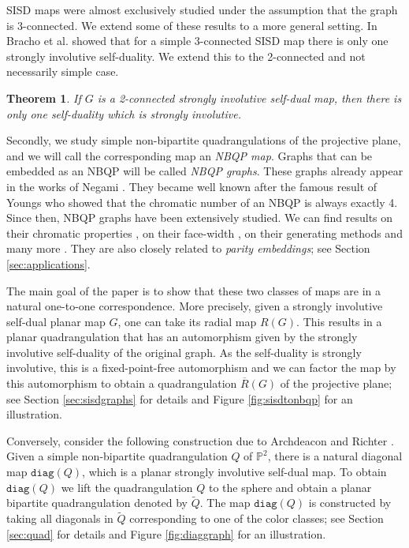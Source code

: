 \documentclass[10pt,a4paper]{article}
\newtheorem{theorem}{Theorem}[section]
\newcommand{\Pb}[0]{\mathbb{P}}
\newcommand{\diag}[0]{\mathtt{diag}}
\begin{document}
SISD maps were almost exclusively studied under the assumption that the graph is 3-connected. We extend some of these results to a more general setting. In \cite{bracho2020strongly} Bracho et al. showed that for a simple 3-connected SISD map there is only one strongly involutive self-duality. We extend this to the 2-connected and not necessarily simple case. 

\begin{theorem}\label{thm:onlyonestrong}
If $G$ is a 2-connected strongly involutive self-dual map, then there is only one self-duality which is strongly involutive. 
\end{theorem}


Secondly, we study simple non-bipartite quadrangulations of the projective plane, and we will call the corresponding map an \emph{NBQP map}. Graphs that can be embedded as an NBQP will be called \emph{NBQP graphs}. These graphs already appear in the works of Negami \cite{NE86,NE92}. They became well known after the famous result of Youngs \cite{YOU96} who showed that the chromatic number of an NBQP is always exactly 4. Since then, NBQP graphs have been extensively studied. We can find results on their chromatic properties \cite{mohar2006quadrangulations,nakamoto2004}, on their face-width \cite{esperet2018}, on their generating methods \cite{NEG93} and many more \cite{cairns2008,KAISER20151,MAT16}.  They are also closely related to \emph{parity embeddings}; see Section \ref{sec:applications}. 

The main goal of the paper is to show that these two classes of maps are in a natural one-to-one correspondence.  More precisely,  given a strongly involutive self-dual planar map $G$, one can take its radial map $R(G)$. This results in a planar quadrangulation that has an automorphism given by the strongly involutive self-duality of the original graph. As the self-duality is strongly involutive, this is a fixed-point-free automorphism and we can factor the map by this automorphism to obtain a quadrangulation $\overline R(G)$ of the projective plane; see Section \ref{sec:sisdgraphs} for details and Figure \ref{fig:sisdtonbqp} for an illustration. 

Conversely, consider the following construction due to Archdeacon and Richter \cite{archdeacon1992construction}. Given a simple non-bipartite quadrangulation $Q$ of $\Pb^2$, there is a natural diagonal map $\diag(Q)$, which is a planar strongly involutive self-dual map. To obtain $\diag(Q)$ we lift the quadrangulation $Q$ to the sphere and obtain a planar bipartite quadrangulation denoted by $\widetilde Q$. The map $\diag(Q)$ is constructed by taking all diagonals in $\widetilde Q$ corresponding to one of the color classes; see Section \ref{sec:quad} for details and Figure \ref{fig:diaggraph} for an illustration.
\end{document}
